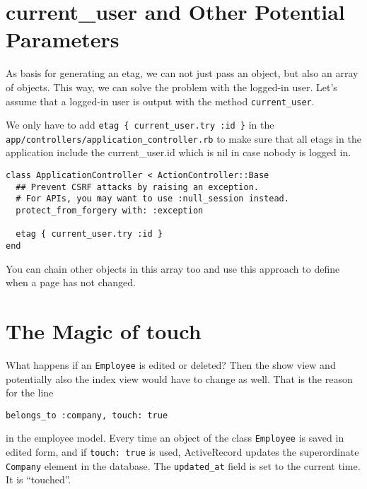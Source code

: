 \documentclass[a4paper]{book}
\newcounter{tab}[chapter]
\begin{document}
\section{current\_user and Other Potential Parameters}\label{currentux5fuser-and-other-potential-parameters}

As basis for generating an etag, we can not just pass an object, but also an array of objects. This way, we can solve the problem with the logged-in user. Let's assume that a logged-in user is output with the method \texttt{current\_user}.

We only have to add \texttt{etag \{ current\_user.try :id \}} in the \texttt{app/controllers/application\_controller.rb} to make sure that all etags in the application include the current\_user.id which is nil in case nobody is logged in.

\begin{shaded}\begin{verbatim}
class ApplicationController < ActionController::Base
  ## Prevent CSRF attacks by raising an exception.
  # For APIs, you may want to use :null_session instead.
  protect_from_forgery with: :exception

  etag { current_user.try :id }
end
\end{verbatim}\end{shaded}

You can chain other objects in this array too and use this approach to define when a page has not changed.

\section{The Magic of touch}\label{the-magic-of-touch}

What happens if an \texttt{Employee} is edited or deleted? Then the show view and potentially also the index view would have to change as well. That is the reason for the line

\begin{shaded}\begin{verbatim}
belongs_to :company, touch: true
\end{verbatim}\end{shaded}

in the employee model. Every time an object of the class \texttt{Employee} is saved in edited form, and if \texttt{touch: true} is used, ActiveRecord updates the superordinate \texttt{Company} element in the database. The \texttt{updated\_at} field is set to the current time. It is “touched”.
\end{document}

